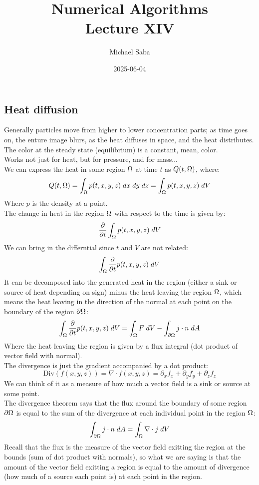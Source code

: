 \documentclass[12pt]{article}
\title{%
    \Huge Numerical Algorithms \\
    \Large Lecture XIV
}
\date{2025-06-04}
\author{Michael Saba}
\begin{document}
\maketitle
\newpage
\setlength{\parindent}{0pt}

\subsection*{Heat diffusion}

Generally particles move from higher to lower concentration
parts; as time goes on, the enture image blurs, as
the heat diffuses in space, and the heat distributes. \\
The color at the steady state
(equilibrium) is a constant, mean, color. \\

Works not just for heat, but for pressure, and for
mass... \\

We can express the heat
in some region $\Omega$ at time $t$
as $Q(t, \Omega)$, where:
\[ Q(t, \Omega) = \int_\Omega p(t, x, y, z) 
\; dx \; dy \; dz
= \int_\Omega p(t, x, y, z) \; dV \]
Where $p$ is the density at a point. \\

The change in heat in the region $\Omega$
with respect to the time is given by:
\[ \dfrac{\partial }{\partial t} \int_\Omega p(t, x, y, z) \; dV \]
We can bring in the differntial
since $t$ and $V$ are not related:
\[ \int_\Omega \dfrac{\partial }{\partial t} p(t, x, y, z) \; dV \]
It can be decomposed into the generated
heat in the region (either a sink or source
of heat depending on sign) minus the heat
leaving the region $\Omega$,
which means the heat leaving in the direction
of the normal at each point
on the boundary of the region $\partial \Omega$:
\[ \int_\Omega  \dfrac{\partial }{\partial t}p(t, x, y, z) \; dV
= \int_\Omega F \; dV
- \int_{\partial \Omega} j \cdot n \; dA \]
Where the heat leaving the region is
given by a flux integral (dot product
of vector field with normal). \\

The divergence is just the gradient
accompanied by a dot product:
\[ \text{Div}(f(x, y, z))
= \nabla \cdot f(x, y, z)
= \partial_x f_x + \partial_y f_y
+ \partial_z f_z \]
We can think of it as a measure of how much
a vector field is a sink or source at 
some point. \\

The divergence theorem
says that the flux around the boundary
of some region $\partial \Omega$ 
is equal to the sum of the divergence at each 
individual point in the region $\Omega$:
\[ \int_{\partial \Omega} j \cdot n \; dA
= \int_{\Omega} \nabla \cdot j \; dV\]
Recall that the flux is the measure of
the vector field exitting the region
at the bounds (sum of dot product with normals),
so what we are saying is that the amount
of the vector field exitting a region
is equal to the amount of divergence
(how much of a source each point is)
at each point in the region. \\
\end{document}
